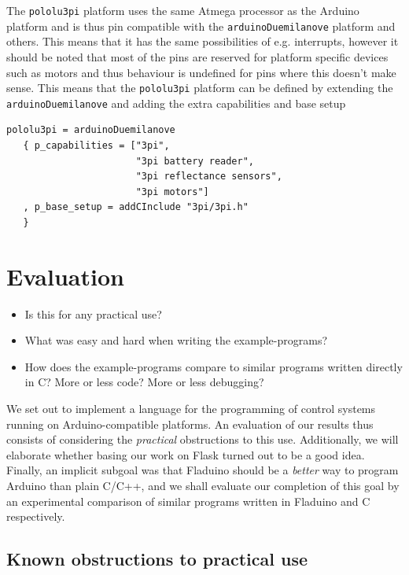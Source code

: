 \documentclass[a4paper, oneside, final]{memoir}
\begin{document}
The \texttt{pololu3pi} platform uses the same Atmega processor as the Arduino
platform and is thus pin compatible with the \texttt{arduinoDuemilanove}
platform and others. This means that it has the same possibilities of e.g.
interrupts, however it should be noted that most of the pins are reserved
\cite{3pi_pin_mapping} for platform specific devices such as motors and thus
behaviour is undefined for pins where this doesn't make sense. This means that
the \texttt{pololu3pi} platform can be defined by extending the
\texttt{arduinoDuemilanove} and adding the extra capabilities and base setup

\begin{verbatim}
pololu3pi = arduinoDuemilanove 
   { p_capabilities = ["3pi", 
                       "3pi battery reader", 
                       "3pi reflectance sensors",
                       "3pi motors"]
   , p_base_setup = addCInclude "3pi/3pi.h"
   }
\end{verbatim}

\chapter{Evaluation}
\label{chap:evaluation}

\begin{itemize}
\item Is this for any practical use?
\item What was easy and hard when writing the example-programs?
\item How does the example-programs compare to similar programs
  written directly in C? More or less code? More or less debugging?
\end{itemize}

We set out to implement a language for the programming of control
systems running on Arduino-compatible platforms.  An evaluation of our
results thus consists of considering the \textit{practical}
obstructions to this use.  Additionally, we will elaborate whether
basing our work on Flask turned out to be a good idea.  Finally, an
implicit subgoal was that Fladuino should be a \textit{better} way to
program Arduino than plain C/C++, and we shall evaluate our completion
of this goal by an experimental comparison of similar programs written
in Fladuino and C respectively.

\section{Known obstructions to practical use}
\end{document}
